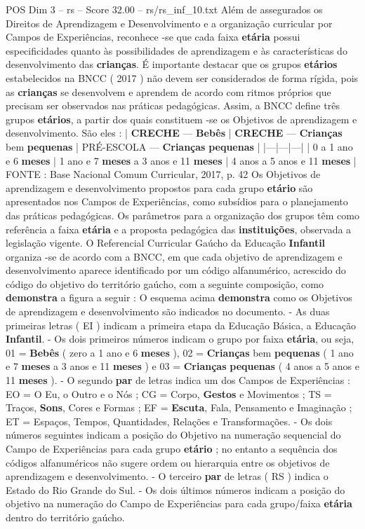 \begin{textsample}{POS Dim 3 – rs – Score 32.00 – rs/rs\_inf\_10.txt}
Além de assegurados os Direitos de Aprendizagem e Desenvolvimento e a organização curricular por Campos de Experiências, reconhece -se que cada faixa \textbf{etária} possui especificidades quanto às possibilidades de aprendizagem e às características do desenvolvimento das \textbf{crianças}.
É importante destacar que os grupos \textbf{etários} estabelecidos na BNCC ( 2017 ) não devem ser considerados de forma rígida, pois as \textbf{crianças} se desenvolvem e aprendem de acordo com ritmos próprios que precisam ser observados nas práticas pedagógicas.
Assim, a BNCC define três grupos \textbf{etários}, a partir dos quais constituem -se os Objetivos de aprendizagem e desenvolvimento.
São eles : | \textbf{CRECHE} — \textbf{Bebês} | \textbf{CRECHE} — \textbf{Crianças} bem \textbf{pequenas} | PRÉ-ESCOLA — \textbf{Crianças} \textbf{pequenas} | |---|---|---| | 0 a 1 ano e 6 \textbf{meses} | 1 ano e 7 \textbf{meses} a 3 anos e 11 \textbf{meses} | 4 anos a 5 anos e 11 \textbf{meses} | FONTE : Base Nacional Comum Curricular, 2017, p. 42 Os Objetivos de aprendizagem e desenvolvimento propostos para cada grupo \textbf{etário} são apresentados nos Campos de Experiências, como subsídios para o planejamento das práticas pedagógicas.
Os parâmetros para a organização dos grupos têm como referência a faixa \textbf{etária} e a proposta pedagógica das \textbf{instituições}, observada a legislação vigente.
O Referencial Curricular Gaúcho da Educação \textbf{Infantil} organiza -se de acordo com a BNCC, em que cada objetivo de aprendizagem e desenvolvimento aparece identificado por um código alfanumérico, acrescido do código do objetivo do território gaúcho, com a seguinte composição, como \textbf{demonstra} a figura a seguir : O esquema acima \textbf{demonstra} como os Objetivos de aprendizagem e desenvolvimento são indicados no documento. - As duas primeiras letras ( EI ) indicam a primeira etapa da Educação Básica, a Educação \textbf{Infantil}. - Os dois primeiros números indicam o grupo por faixa \textbf{etária}, ou seja, 01 = \textbf{Bebês} ( zero a 1 ano e 6 \textbf{meses} ), 02 = \textbf{Crianças} bem \textbf{pequenas} ( 1 ano e 7 \textbf{meses} a 3 anos e 11 \textbf{meses} ) e 03 = \textbf{Crianças} \textbf{pequenas} ( 4 anos a 5 anos e 11 \textbf{meses} ). - O segundo \textbf{par} de letras indica um dos Campos de Experiências : EO = O Eu, o Outro e o Nós ; CG = Corpo, \textbf{Gestos} e Movimentos ; TS = Traços, \textbf{Sons}, Cores e Formas ; EF = \textbf{Escuta}, Fala, Pensamento e Imaginação ; ET = Espaços, Tempos, Quantidades, Relações e Transformações. - Os dois números seguintes indicam a posição do Objetivo na numeração sequencial do Campo de Experiências para cada grupo \textbf{etário} ; no entanto a sequência dos códigos alfanuméricos não sugere ordem ou hierarquia entre os objetivos de aprendizagem e desenvolvimento. - O terceiro \textbf{par} de letras ( RS ) indica o Estado do Rio Grande do Sul. - Os dois últimos números indicam a posição do objetivo na numeração do Campo de Experiências para cada grupo/faixa \textbf{etária} dentro do território gaúcho.

\end{textsample}
